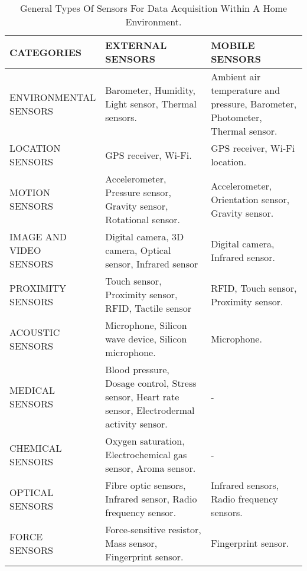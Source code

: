 \begin{table}[H]
\centering
\caption{General Types Of Sensors For Data Acquisition Within A Home Environment.}
\begin{tabular}{|p{3.5cm}|p{5cm}|p{5cm}|} 
\hline
\textbf{CATEGORIES} & \textbf{EXTERNAL SENSORS} & \textbf{MOBILE SENSORS} \\
\hline
\parbox[t]{4.5cm}{ENVIRONMENTAL \\ SENSORS} & Barometer, Humidity, Light sensor, Thermal sensors. & Ambient air temperature and pressure, Barometer, Photometer, Thermal sensor. \\
\hline
\parbox[t]{4.5cm}{LOCATION \\ SENSORS} & GPS receiver, Wi-Fi. & GPS receiver, Wi-Fi location. \\
\hline
\parbox[t]{4.5cm}{MOTION \\ SENSORS} & Accelerometer, Pressure sensor, Gravity sensor, Rotational sensor. & Accelerometer, Orientation sensor, Gravity sensor. \\
\hline
\parbox[t]{4.5cm}{IMAGE AND \\ VIDEO \\ SENSORS} & Digital camera, 3D camera, Optical sensor, Infrared sensor & Digital camera, Infrared sensor. \\
\hline
\parbox[t]{4.5cm}{PROXIMITY \\ SENSORS} & Touch sensor, Proximity sensor, RFID, Tactile sensor & RFID, Touch sensor, Proximity sensor. \\
\hline
\parbox[t]{4.5cm}{ACOUSTIC \\ SENSORS} & Microphone, Silicon wave device, Silicon microphone. & Microphone. \\
\hline
\parbox[t]{4.5cm}{MEDICAL \\ SENSORS} & Blood pressure, Dosage control, Stress sensor, Heart rate sensor, Electrodermal activity sensor. & - \\
\hline
\parbox[t]{4.5cm}{CHEMICAL \\ SENSORS} & Oxygen saturation, Electrochemical gas sensor, Aroma sensor. & - \\
\hline
\parbox[t]{4.5cm}{OPTICAL \\ SENSORS} & Fibre optic sensors, Infrared sensor, Radio frequency sensor. & Infrared sensors, Radio frequency sensors. \\
\hline
\parbox[t]{4.5cm}{FORCE \\ SENSORS} & Force-sensitive resistor, Mass sensor, Fingerprint sensor. & Fingerprint sensor. \\
\hline
\end{tabular}
\end{table}

